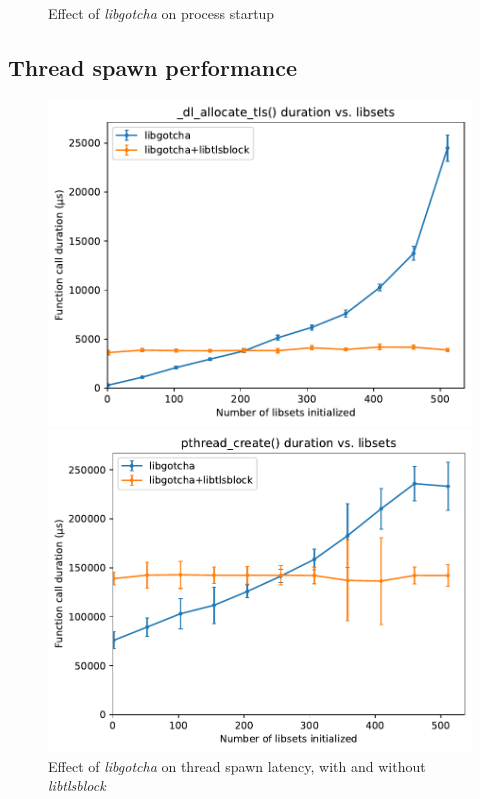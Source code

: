 \begin{figure}
\begin{minipage}{0.5\textwidth}
	\label{fig:libgotcha:dyno}
	\end{minipage}
\caption{Effect of \textit{libgotcha} on process startup}
\end{figure}


\subsection{Thread spawn performance}
\label{sec:libgotcha:libtlsblock}

\begin{figure}
	\begin{minipage}{0.5\textwidth}
	\includegraphics[width=\textwidth]{figs/tlsblock-rperfb}
	\end{minipage}
%
	\begin{minipage}{0.5\textwidth}
	\includegraphics[width=\textwidth]{figs/tlsblock-spawn}
	\end{minipage}
\caption{Effect of \textit{libgotcha} on thread spawn latency, with and without \textit{libtlsblock}}
\label{fig:libgotcha:spawntls}
\end{figure}

